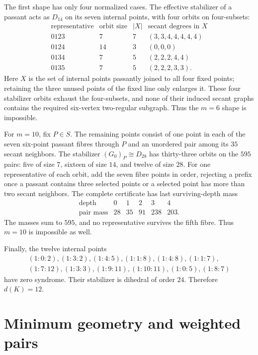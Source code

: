 \documentclass[11pt]{article}
\theoremstyle{definition}
\theoremstyle{remark}
\begin{document}
The first shape has only four normalized cases.  The effective stabilizer of
a passant acts as \(D_{14}\) on its seven internal points, with four orbits
on four-subsets:
\[
\begin{array}{c|c|c|c}
\text{representative}&\text{orbit size}&|X|&
 \text{secant degrees in }X\\ \hline
0123&7&7&(3,3,4,4,4,4,4)\\
0124&14&3&(0,0,0)\\
0134&7&5&(2,2,2,4,4)\\
0135&7&5&(2,2,2,3,3).
\end{array}
\]
Here \(X\) is the set of internal points passantly joined to all four fixed
points; retaining the three unused points of the fixed line only enlarges
it.  These four stabilizer orbits exhaust the four-subsets, and none of their
induced secant graphs contains the required six-vertex two-regular subgraph.
Thus the \(m=6\) shape is impossible.

For \(m=10\), fix \(P\in S\).  The remaining points consist of one point in
each of the seven six-point passant fibres through \(P\) and an unordered
pair among its \(35\) secant neighbors.  The stabilizer
\((G_0)_P\cong D_{28}\) has thirty-three orbits on the \(595\) pairs: five of
size \(7\), sixteen of size \(14\), and twelve of size \(28\).  For one
representative of each orbit, add the seven fibre points in order, rejecting
a prefix once a passant contains three selected points or a selected point
has more than two secant neighbors.  The complete certificate has last
surviving-depth mass
\[
\begin{array}{c|rrrrr}
\text{depth}&0&1&2&3&4\\ \hline
\text{pair mass}&28&35&91&238&203.
\end{array}
\]
The masses sum to \(595\), and no representative survives the fifth fibre.
Thus \(m=10\) is impossible as well.

Finally, the twelve internal points
\[
\begin{gathered}
(1:0:2),(1:3:2),(1:4:5),(1:1:8),
(1:4:8),(1:1:7),\\
(1:7:12),(1:3:3),(1:9:11),(1:10:11),
(1:0:5),(1:8:7)
\end{gathered}
\]
have zero syndrome.  Their stabilizer is dihedral of order \(24\).
Therefore \(d(K)=12\).

\section{Minimum geometry and weighted pairs}
\label{sec:minimum-geometry}
\end{document}
